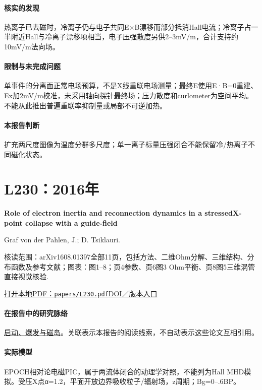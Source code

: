 \paragraph{核实的发现}热离子已去磁时，冷离子仍与电子共同E×B漂移而部分抵消Hall电流；冷离子占一半附近Hall与冷离子漂移项相当，电子压强散度另供2–3mV/m，合计支持约10mV/m法向场。

\paragraph{限制与未完成问题}单事件的分离面正常电场预算，不是X线重联电场测量；最终E使用E·B=0重建、Ex加2mV/m校准，未采用轴向探针最终场；压力散度和curlometer为空间平均。不能从此推出普遍重联率抑制量或局部不可逆加热。

\paragraph{本报告判断}扩充两尺度图像为温度分群多尺度；单一离子标量压强闭合不能保留冷/热离子不同磁化状态。

\section{L230：2016年}\label{paper:L230}

\textbf{Role of electron inertia and reconnection dynamics in a stressedX-point collapse with a guide-field}\citep{L230}\

Graf von der Pahlen,  J.;  D. Tsiklauri.

\textsf{核读范围：}arXiv1608.01397全部11页，包括方法、二维Ohm分解、三维结构、分布函数及参考文献；\textsf{图表：}图1–8；页4参数、页6图3 Ohm平衡、页8图5三维涡管直接视觉核验.

\href{run:papers/L230.pdf}{打开本地PDF：\texttt{papers/L230.pdf}}\quad\href{https://doi.org/10.1051/0004-6361/201628071}{DOI／版本入口}

\paragraph{在报告中的研究脉络}\hyperref[story:onset]{启动、爆发与磁岛}。关联表示本报告的阅读线索，不自动表示这些论文互相引用。

\paragraph{实际模型}EPOCH相对论电磁PIC，属于两流体闭合的动理学对照，不能列为Hall MHD模拟。受压X点α=1.2，平面开放边界吸收粒子/辐射场，z周期；Bg=0–.6BP。


